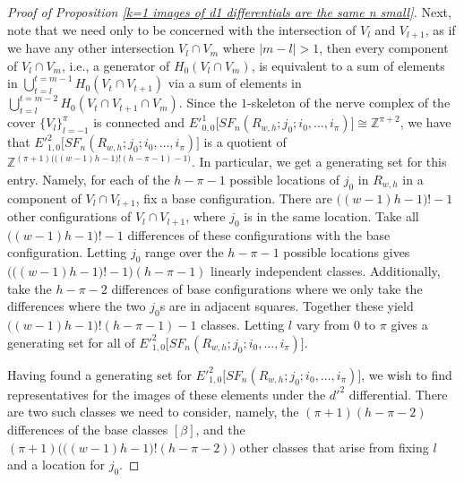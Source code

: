 \documentclass[pagebackref,colorlinks,citecolor=blue,linkcolor=blue,urlcolor=blue,filecolor=blue]{article}
\theoremstyle{definition}\newtheorem{definition}[thm]{Definition}
\theoremstyle{definition}
\newcommand{\Z}{\ensuremath{\mathbb{Z}}}
\begin{document}
\begin{proof}[Proof of Proposition \ref{k=1 images of d1 differentials are the same n small}]
Next, note that we need only to be concerned with the intersection of $V_{l}$ and $V_{l+1}$, as if we have any other intersection $V_{l}\cap V_{m}$ where $|m-l|>1$, then every component of $V_{l}\cap V_{m}$, i.e., a generator of $H_{0}(V_{l}\cap V_{m})$, is equivalent to a sum of elements in $\bigcup_{t=l}^{t=m-1} H_{0}(V_{t}\cap V_{t+1})$ via a sum of elements in $\bigcup_{t=l}^{t=m-2} H_{0}(V_{t}\cap V_{t+1}\cap V_{m})$.
Since the $1$-skeleton of the nerve complex of the cover $\{V_{l}\}_{l=-1}^{\pi}$ is connected and $E'^{1}_{0,0}\big[SF_{n}(R_{w, h}; j_{0};i_{0}, \dots, i_{\pi})\big]\cong \Z^{\pi+2}$,
we have that $E'^{2}_{1,0}\big[SF_{n}(R_{w, h}; j_{0};i_{0}, \dots, i_{\pi})\big]$
is a quotient of $\Z^{(\pi+1)\Big(\big((w-1)h-1\big)!(h-\pi-1)-1\Big)}$.
In particular, we get a generating set for this entry.
Namely, for each of the $h-\pi-1$ possible locations of $j_{0}$ in $R_{w, h}$ in a component of $V_{l}\cap V_{l+1}$, fix a base configuration.
There are $\big((w-1)h-1\big)!-1$ other configurations of $V_{l}\cap V_{l+1}$, where $j_{0}$ is in the same location.
Take all $\big((w-1)h-1\big)!-1$ differences of these configurations with the base configuration.
Letting $j_{0}$ range over the $h-\pi-1$ possible locations gives $\Big(\big((w-1) h-1\big)!-1\Big)(h-\pi-1)$ linearly independent classes.
Additionally, take the $h-\pi-2$ differences of base configurations where we only take the differences where the two $j_{0}$s are in adjacent squares.
Together these yield $\big((w-1)h-1\big)!(h-\pi-1)-1$ classes.
Letting $l$ vary from $0$ to $\pi$ gives a generating set for all of $E'^{2}_{1,0}\big[SF_{n}(R_{w, h}; j_{0};i_{0}, \dots, i_{\pi})\big]$.

Having found a generating set for $E'^{2}_{1,0}\big[SF_{n}(R_{w, h}; j_{0};i_{0}, \dots, i_{\pi})\big]$, we wish to find representatives for the images of these elements under the $d'^{2}$ differential. 
There are two such classes we need to consider, namely, the $(\pi+1)(h-\pi-2)$ differences of the base classes $[\beta]$, and the $(\pi+1)\Big(\big((w-1)h-1\big)!(h-\pi-2)\Big)$ other classes that arise from fixing $l$ and a location for $j_{0}$.


\end{proof}
\end{document}
